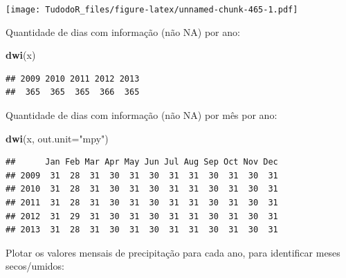 \documentclass[
]{book}
\newenvironment{Shaded}{\begin{snugshade}}{\end{snugshade}}
\newcommand{\CommentTok}[1]{\textcolor[rgb]{0.56,0.35,0.01}{\textit{#1}}}
\newcommand{\DataTypeTok}[1]{\textcolor[rgb]{0.13,0.29,0.53}{#1}}
\newcommand{\DecValTok}[1]{\textcolor[rgb]{0.00,0.00,0.81}{#1}}
\newcommand{\KeywordTok}[1]{\textcolor[rgb]{0.13,0.29,0.53}{\textbf{#1}}}
\newcommand{\NormalTok}[1]{#1}
\newcommand{\OtherTok}[1]{\textcolor[rgb]{0.56,0.35,0.01}{#1}}
\newcommand{\StringTok}[1]{\textcolor[rgb]{0.31,0.60,0.02}{#1}}
\begin{document}
\texttt{[image: TudodoR\_files/figure-latex/unnamed-chunk-465-1.pdf]}

Quantidade de dias com informação (não NA) por ano:

\begin{Shaded}
\begin{Highlighting}[]
\KeywordTok{dwi}\NormalTok{(x)}
\end{Highlighting}
\end{Shaded}

\begin{verbatim}
## 2009 2010 2011 2012 2013 
##  365  365  365  366  365
\end{verbatim}

Quantidade de dias com informação (não NA) por mês por ano:

\begin{Shaded}
\begin{Highlighting}[]
\KeywordTok{dwi}\NormalTok{(x, }\DataTypeTok{out.unit=}\StringTok{"mpy"}\NormalTok{)}
\end{Highlighting}
\end{Shaded}

\begin{verbatim}
##      Jan Feb Mar Apr May Jun Jul Aug Sep Oct Nov Dec
## 2009  31  28  31  30  31  30  31  31  30  31  30  31
## 2010  31  28  31  30  31  30  31  31  30  31  30  31
## 2011  31  28  31  30  31  30  31  31  30  31  30  31
## 2012  31  29  31  30  31  30  31  31  30  31  30  31
## 2013  31  28  31  30  31  30  31  31  30  31  30  31
\end{verbatim}

Plotar os valores mensais de precipitação para cada ano, para identificar meses secos/umidos:

\begin{Shaded}
\end{Shaded}
\end{document}
